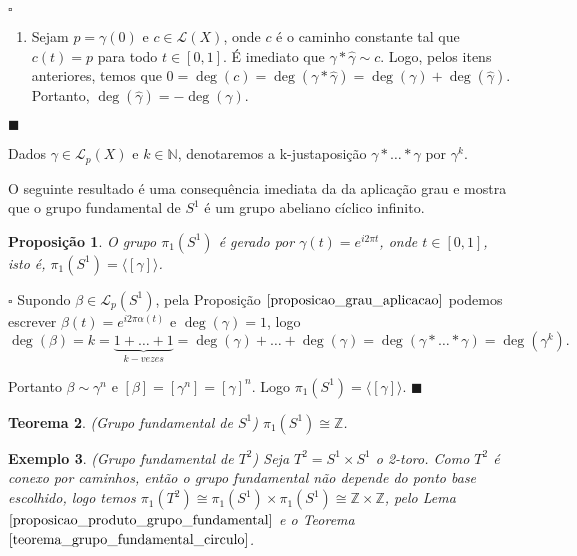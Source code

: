 \documentclass[12pt]{book}
\newtheorem{teorema}{Teorema}[section]
\newtheorem{exemplo}[teorema]{Exemplo}
\newtheorem{proposicao}[teorema]{Proposição}
\newenvironment{prova}[1]{$\square$ #1}{\hfill$\blacksquare$}
\newcommand{\caminhos}{\mathcal{L}}
\newcommand{\caminhossempontobase}[1]{\caminhos(#1)}
\newcommand{\caminhospontobasegeral}[2]{\caminhos_{#1}(#2)}
\newcommand{\circulo}{S^{1}}
\newcommand{\classe}[1]{[#1]}
\newcommand{\gerador}[1]{\langle #1\rangle}
\newcommand{\grupofundamental}[1]{\pi_{1}(#1)}
\newcommand{\inteiros}{\mathbb{Z}}
\newcommand{\intervalo}{[0,1]}
\begin{document}
\begin{prova}
\begin{enumerate}
			\item Sejam $p=\gamma(0)$ e $c\in \caminhossempontobase{X}$, onde $c$ é o caminho constante tal que $c(t)=p$ para todo $t\in \intervalo$. É imediato que $\gamma*\hat{\gamma}  \sim c$. Logo, pelos itens anteriores, temos que $0=\deg(c) = \deg(\gamma*\hat{\gamma} ) = \deg(\gamma) + \deg(\hat{\gamma} )$. Portanto, $\deg(\hat{\gamma} ) = -\deg(\gamma) $.
		\end{enumerate}
	\end{prova}
	
	Dados $\gamma \in \caminhospontobasegeral{p}{X}$ e $k \in \mathbb{N}$, denotaremos a k-justaposição $\gamma*\dots * \gamma$ por $\gamma^{k}$.
	
	O seguinte resultado é uma consequência imediata da da aplicação grau e mostra que o grupo fundamental de $\circulo$ é um grupo abeliano cíclico infinito.
	
	\begin{proposicao}\label{proposicao_gerador_grupo_fundamental_ciruclo}
		O grupo $\grupofundamental{\circulo}$ é gerado por $\gamma(t) = e^{i2\pi t}$, onde $t \in [0,1]$, isto é, $\grupofundamental{\circulo} = \gerador{\classe{\gamma}} $.
	\end{proposicao}
	\begin{prova}
		Supondo $\beta \in \caminhospontobasegeral{p}{\circulo}$, pela Proposição $\ref{proposicao_grau_aplicacao}$ podemos escrever $\beta(t)=e^{i2\pi \alpha(t)}$ e $\deg(\gamma) = 1$, logo 
		$$
		\deg(\beta) = k = \underbrace{1+\dots+1}_{k-vezes} = \deg(\gamma)+\dots+\deg(\gamma) = \deg(\gamma *\dots *\gamma) = \deg(\gamma^{k}).
		$$
		
		Portanto $\beta \sim \gamma^{n}$ e $\classe{\beta} = \classe{\gamma^{n}}=\classe{\gamma}^{n}$. Logo $\grupofundamental{\circulo} = \gerador{\classe{\gamma}}$.
	\end{prova}
	
	\begin{teorema}\label{teorema_grupo_fundamental_circulo}
		(Grupo fundamental de $\circulo$) $\grupofundamental{\circulo} \cong \inteiros$.
	\end{teorema}
	
	\begin{exemplo}
		(Grupo fundamental de $T^{2}$) Seja $T^{2}=\circulo \times \circulo$ o 2-toro. Como $T^{2}$ é conexo por caminhos, então o grupo fundamental não depende do ponto base escolhido, logo temos $\grupofundamental{T^{2}} \cong \grupofundamental{\circulo} \times \grupofundamental{\circulo} \cong \inteiros \times \inteiros$, pelo Lema $\ref{proposicao_produto_grupo_fundamental}$ e o Teorema $\ref{teorema_grupo_fundamental_circulo}$. 
	\end{exemplo}
	
\end{document}
